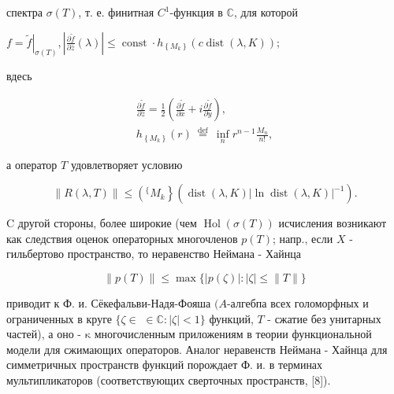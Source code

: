 \documentclass[10pt]{article}
\begin{document}
спектра $\sigma(T)$, т. е. финитная $C^{1}$-функция в $\mathbb{C}$, для которой



$f=\left.\tilde{f}\right|_{\sigma(T)},\left|\frac{\partial \tilde{f}}{\partial \bar{z}}(\lambda)\right| \leqslant \operatorname{const} \cdot h_{\left\{M_{k}\right\}}(c \operatorname{dist}(\lambda, K)) ;$



вдесь



\[

\begin{gathered}

\frac{\partial \tilde{f}}{\partial \bar{z}}=\frac{1}{2}\left(\frac{\partial \tilde{f}}{\partial x}+i \frac{\partial \tilde{f}}{\partial y}\right), \\

h_{\left\{M_{k}\right\}}(r) \stackrel{\text { def }}{=} \inf _{n} r^{n-1} \frac{M_{n}}{n !},

\end{gathered}

\]



а оператор $T$ удовлетворяет условию



\[

\|R(\lambda, T)\| \leqslant\left({ }^{\{} M_{k}\right\}\left(\operatorname{dist}(\lambda, K)|\ln \operatorname{dist}(\lambda, K)|^{-1}\right) .

\]



C другой стороны, более широкие (чем $\operatorname{Hol}(\sigma(T))$ исчисления возникают как следствия оценок операторных многочленов $p(T)$; напр., если $X$ - гильбертово пространство, то неравенство Неймана - Хайнца



\[

\|p(T)\| \leqslant \max \{|p(\zeta)|:|\zeta| \leqslant\|T\|\}

\]



приводит к Ф. и. Сёкефальви-Надя-Фояша $(A$-алгебпа всех голоморфных и ограниченных в круге $\{\zeta \in$ $\in \mathbb{C}:|\zeta|<1\}$ функций, $T$ - сжатие без унитарных частей), а оно - $\mathrm{\kappa}$ многочисленным приложениям в теории функциональной модели для сжимающих операторов. Аналог неравенств Неймана - Хайнца для симметричных пространств функций порождает Ф. и. в терминах мультипликаторов (соответствующих сверточных пространств, [8]).
\end{document}
